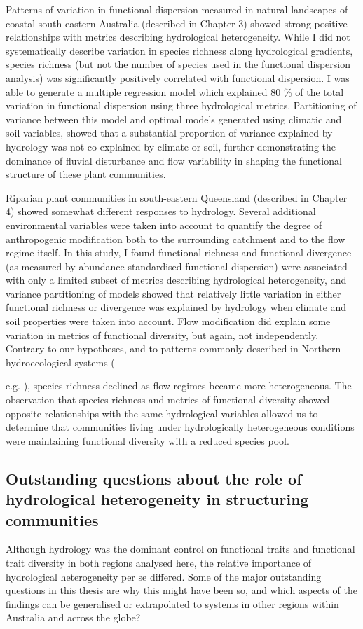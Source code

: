 \documentclass[openright,12pt,a4paper]{memoir}
\begin{document}
{Patterns of variation in functional dispersion measured in natural landscapes of coastal south-eastern Australia (described in Chapter 3) showed strong positive relationships with metrics describing hydrological heterogeneity. While I did not systematically describe variation in species richness along hydrological gradients, species richness (but not the number of species used in the functional dispersion analysis) was significantly positively correlated with functional dispersion. I was able to generate a multiple regression model which explained 80 \% of the total variation in functional dispersion using three hydrological metrics. Partitioning of variance between this model and optimal models generated using climatic and soil variables, showed that a substantial proportion of variance explained by hydrology was not co-explained by climate or soil, further demonstrating the dominance of fluvial disturbance and flow variability in shaping the functional structure of these plant communities.

Riparian plant communities in south-eastern Queensland (described in Chapter 4) showed somewhat different responses to hydrology. Several additional environmental variables were taken into account to quantify the degree of anthropogenic modification both to the surrounding catchment and to the flow regime itself. In this study, I found functional richness and functional divergence (as measured by abundance-standardised functional dispersion) were associated with only a limited subset of metrics describing hydrological heterogeneity, and variance partitioning of models showed that relatively little variation in either functional richness or divergence was explained by hydrology when climate and soil properties were taken into account. Flow modification did explain some variation in metrics of functional diversity, but again, not independently. Contrary to our hypotheses, and to patterns commonly described in Northern hydroecological systems ({e.g. \citep{Naiman1997}), species richness declined as flow regimes became more heterogeneous. The observation that species richness and metrics of functional diversity showed opposite relationships with the same hydrological variables allowed us to determine that communities living under hydrologically heterogeneous conditions were maintaining functional diversity with a reduced species pool. 

\subsection{Outstanding questions about the role of hydrological heterogeneity in structuring communities}
Although hydrology was the dominant control on functional traits and functional trait diversity in both regions analysed here, the relative importance of hydrological heterogeneity per se differed. Some of the major outstanding questions in this thesis are why this might have been so, and which aspects of the findings can be generalised or extrapolated to systems in other regions within Australia and across the globe?

}}
\end{document}
